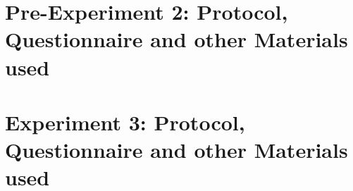 \chapter{Pre-Experiment 2: Protocol, Questionnaire and other Materials used}
\label{app:exp2}
%
%


\chapter{Experiment 3: Protocol, Questionnaire and other Materials used}
\label{app:exp3}
%
%
%
%
%